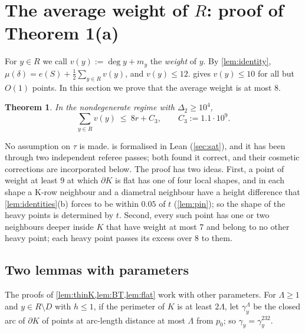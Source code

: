 \documentclass[11pt]{amsart}
\newtheorem{theorem}{Theorem}[section]
\theoremstyle{definition}
\theoremstyle{remark}
\newcommand{\Dt}{\Delta_2}
\newcommand{\mult}{\mu}
\begin{document}
\section{The average weight of \texorpdfstring{$R$}{R}: proof of Theorem 1(a)}\label{sec:N3}

For $y\in R$ we call $v(y):=\deg y+m_y$ the \emph{weight} of $y$. By \cref{lem:identity}, $\mult(\delta)=e(S)+\frac12\sum_{y\in R}v(y)$, and $v(y)\le12$.  gives $v(y)\le10$ for all but $O(1)$ points. In this section we prove that the average weight is at most $8$.

\begin{theorem}\label{thm:N3}
In the nondegenerate regime with $\Dt\ge10^4$,
\[
\sum_{y\in R}v(y)\ \le\ 8r+C_3,\qquad C_3:=1.1\cdot10^9 .
\]
\end{theorem}
No assumption on $\tau$ is made.  is formalised in Lean (\cref{sec:sat}), and it has been through two independent referee passes; both found it correct, and their cosmetic corrections are incorporated below. The proof has two ideas. First, a point of weight at least $9$ at which $\partial K$ is flat has one of four local shapes, and in each shape a K-row neighbour and a diametral neighbour have a height difference that \cref{lem:identities}(b) forces to be within $0.05$ of $t$ (\cref{lem:pin}); so the shape of the heavy points is determined by $t$. Second, every such point has one or two neighbours deeper inside $K$ that have weight at most $7$ and belong to no other heavy point; each heavy point passes its excess over $8$ to them.

\subsection{Two lemmas with parameters}
The proofs of \cref{lem:thinK,lem:BT,lem:flat} work with other parameters. For $\Lambda\ge1$ and $y\in R\setminus D$ with $h\le1$, if the perimeter of $K$ is at least $2\Lambda$, let $\gamma_y^\Lambda$ be the closed arc of $\partial K$ of points at arc-length distance at most $\Lambda$ from $p_0$; so $\gamma_y=\gamma_y^{232}$.
\end{document}
